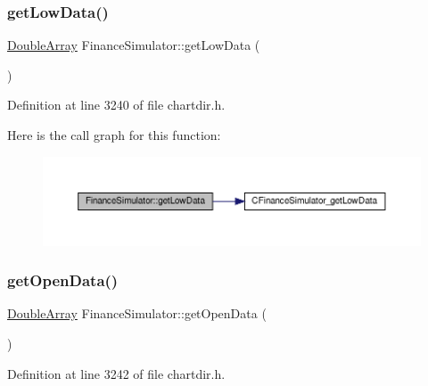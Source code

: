 \subsubsection{\texorpdfstring{get\+Low\+Data()}{getLowData()}}
{\footnotesize\ttfamily \hyperlink{class_double_array}{Double\+Array} Finance\+Simulator\+::get\+Low\+Data (\begin{DoxyParamCaption}{ }\end{DoxyParamCaption})\hspace{0.3cm}{\ttfamily [inline]}}



Definition at line 3240 of file chartdir.\+h.

Here is the call graph for this function\+:
\nopagebreak
\begin{figure}[H]
\begin{center}
\leavevmode
\includegraphics[width=350pt]{class_finance_simulator_aba8c5020220b871f5a599d4424fc0697_cgraph}
\end{center}
\end{figure}
\mbox{\label{class_finance_simulator_aed86f3c9c364cb0ddfb7880c81a591f5}} 
\subsubsection{\texorpdfstring{get\+Open\+Data()}{getOpenData()}}
{\footnotesize\ttfamily \hyperlink{class_double_array}{Double\+Array} Finance\+Simulator\+::get\+Open\+Data (\begin{DoxyParamCaption}{ }\end{DoxyParamCaption})\hspace{0.3cm}{\ttfamily [inline]}}



Definition at line 3242 of file chartdir.\+h.

